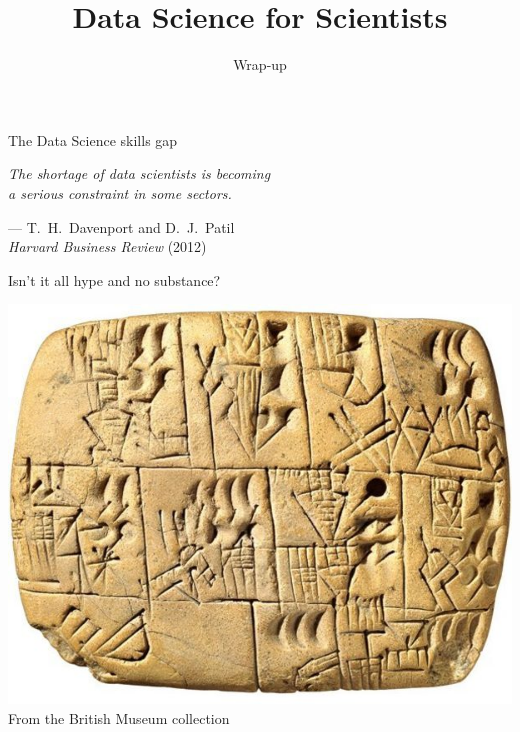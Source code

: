 

\title{Data Science for Scientists}
\subtitle{Wrap\hyp{}up}



\maketitle

\begin{frame}{The Data Science skills gap}
    \begin{center}
        \Large\it%
        The shortage of data scientists is becoming \\[\medskipamount]
        a serious constraint in some sectors.
    \end{center}
    \vfill
    \begin{flushright}
        --- T.\ H.\ Davenport and D.\ J.\ Patil \\
            \textit{Harvard Business Review} (2012)
    \end{flushright}
\end{frame}

\begin{frame}
    \begin{center}
        \LARGE%
        Isn't it all hype and no substance?
    \end{center}
\end{frame}

\begin{frame}
    \begin{center}
        \includegraphics[height=0.8\textheight]{figures/counting_beer} \\
        {\scriptsize%
         From the British Museum collection}
    \end{center}
\end{frame}

